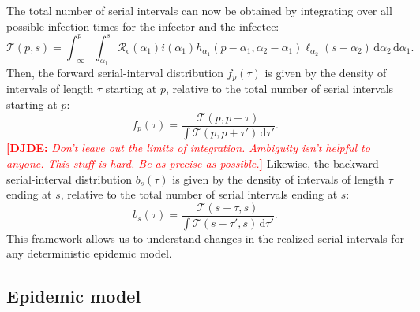 \documentclass[12pt]{article}
\newcommand{\comment}{\showcomment}
\newcommand{\showcomment}[3]{\textcolor{#1}{\textbf{[#2: }\textsl{#3}\textbf{]}}}
\newcommand{\djde}[1]{\comment{red}{DJDE}{#1}}
\newcommand{\Rx}[1]{\ensuremath{{\mathcal R}_{#1}}\xspace}
\newcommand{\Rc}{\Rx{\mathrm{c}}}
\newcommand{\dd}[1]{\ensuremath{\, \mathrm{d}#1}}
\newcommand{\dtau}{\dd{\tau}}
\newcommand{\psymp}{\ensuremath{p}} %
\newcommand{\ssymp}{\ensuremath{s}} %
\newcommand{\pinf}{\ensuremath{\alpha_1}} %
\newcommand{\sinf}{\ensuremath{\alpha_2}} %
\newcommand{\idist}{\ell} %
\newcommand{\total}{{\mathcal T}} %
\begin{document}
The total number of serial intervals can now be obtained by integrating over all possible infection times for the infector and the infectee:
\begin{equation}
\total (\psymp,\ssymp) = \int_{-\infty}^{\psymp} \int_{\pinf}^{\ssymp} \Rc (\pinf) i(\pinf) h_{\pinf}(\psymp-\pinf, \sinf - \pinf) \idist_{\sinf}(\ssymp - \sinf) \, \mathrm{d}\sinf\,\mathrm{d}\pinf.
\end{equation}
Then, the forward serial-interval distribution $f_\psymp(\tau)$ is given by the density of intervals of length $\tau$ starting at \psymp, relative to the total number of serial intervals starting at \psymp: 
\begin{equation}
f_\psymp(\tau) = 
\frac{\total(\psymp, \psymp+\tau)}{\int \total(\psymp, \psymp+\tau') \dtau'}.
\label{eq:fserial}
\end{equation}
\djde{Don't leave out the limits of integration.  Ambiguity isn't
  helpful to anyone.  This stuff is hard.  Be as precise as possible.}
Likewise, the backward serial-interval distribution $b_\ssymp(\tau)$ is given by the density of intervals of length $\tau$ ending at \ssymp, relative to the total number of serial intervals ending at \ssymp: 
\begin{equation}
b_\ssymp(\tau) = 
\frac{\total(\ssymp-\tau, \ssymp)}{\int \total(\ssymp-\tau', \ssymp) \dtau'}.
\label{eq:bserial}
\end{equation}
This framework allows us to understand changes in the realized serial intervals for any deterministic epidemic model.

\subsection{Epidemic model}
\end{document}
